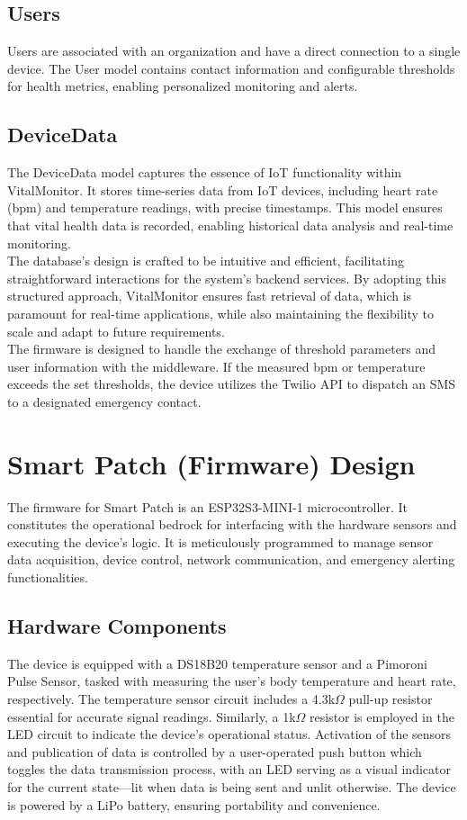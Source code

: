 \subsection{Users}
Users are associated with an organization and have a direct connection to a single device. The User model contains contact information and configurable thresholds for health metrics, enabling personalized monitoring and alerts.

\subsection{DeviceData}
The DeviceData model captures the essence of IoT functionality within VitalMonitor. It stores time-series data from IoT devices, including heart rate (bpm) and temperature readings, with precise timestamps. This model ensures that vital health data is recorded, enabling historical data analysis and real-time monitoring.\\

\noindent The database's design is crafted to be intuitive and efficient, facilitating straightforward interactions for the system's backend services. By adopting this structured approach, VitalMonitor ensures fast retrieval of data, which is paramount for real-time applications, while also maintaining the flexibility to scale and adapt to future requirements. \\

\noindent The firmware is designed to handle the exchange of threshold parameters and user information with the middleware. If the measured bpm or temperature exceeds the set thresholds, the device utilizes the Twilio API to dispatch an SMS to a designated emergency contact.

\section{Smart Patch (Firmware) Design}

The firmware for Smart Patch is an ESP32S3-MINI-1 microcontroller. It constitutes the operational bedrock for interfacing with the hardware sensors and executing the device's logic. It is meticulously programmed to manage sensor data acquisition, device control, network communication, and emergency alerting functionalities.

\subsection{Hardware Components}
The device is equipped with a DS18B20 temperature sensor and a Pimoroni Pulse Sensor, tasked with measuring the user's body temperature and heart rate, respectively. The temperature sensor circuit includes a 4.3k\(\Omega\) pull-up resistor essential for accurate signal readings. Similarly, a 1k\(\Omega\) resistor is employed in the LED circuit to indicate the device's operational status. Activation of the sensors and publication of data is controlled by a user-operated push button which toggles the data transmission process, with an LED serving as a visual indicator for the current state—lit when data is being sent and unlit otherwise. The device is powered by a LiPo battery, ensuring portability and convenience.


